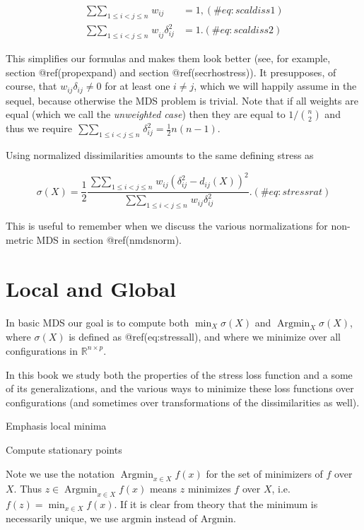 \documentclass[
  12pt,
  letterpaper,
  DIV=11,
  numbers=noendperiod]{scrreprt}
\theoremstyle{remark}
\begin{document}
\begin{align}
\mathop{\sum\sum}_{1\leq i<j\leq n}w_{ij}&=1,(\#eq:scaldiss1)\\
\mathop{\sum\sum}_{1\leq i<j\leq n}w_{ij}^{\ }\delta_{ij}^2&=1.(\#eq:scaldiss2)
\end{align}

This simplifies our formulas and makes them look better (see, for
example, section @ref(propexpand) and section @ref(secrhostress)). It
presupposes, of course, that \(w_{ij}\delta_{ij}\not=0\) for at least
one \(i\not= j\), which we will happily assume in the sequel, because
otherwise the MDS problem is trivial. Note that if all weights are equal
(which we call the \emph{unweighted case}) then they are equal to
\(1/\binom{n}{2}\) and thus we require
\(\mathop{\sum\sum}_{1\leq i<j\leq n}\delta_{ij}^2=\frac12n(n-1)\).

Using normalized dissimilarities amounts to the same defining stress as

\begin{equation}
\sigma(X)=\frac12\frac{\mathop{\sum\sum}_{1\leq i<j\leq n}w_{ij}(\delta_{ij}^2-d_{ij}(X))^2}{\mathop{\sum\sum}_{1\leq i<j\leq n}w_{ij}\delta_{ij}^2}.
(\#eq:stressrat)
\end{equation}

This is useful to remember when we discuss the various normalizations
for non-metric MDS in section @ref(nmdsnorm).

\section{Local and Global}\label{seclocglob}

In basic MDS our goal is to compute both \(\min_X\sigma(X)\) and
\(\mathop{\text{Argmin}}_X\sigma(X)\), where \(\sigma(X)\) is defined as
@ref(eq:stressall), and where we minimize over all configurations in
\(\mathbb{R}^{n\times p}\).

In this book we study both the properties of the stress loss function
and a some of its generalizations, and the various ways to minimize
these loss functions over configurations (and sometimes over
transformations of the dissimilarities as well).

Emphasis local minima

Compute stationary points

Note we use the notation \(\mathop{\text{Argmin}}_{x\in X}f(x)\) for the
set of minimizers of \(f\) over \(X\). Thus
\(z\in\mathop{\text{Argmin}}_{x\in X}f(x)\) means \(z\) minimizes \(f\)
over \(X\), i.e.~\(f(z)=\min_{x\in X} f(x)\). If it is clear from theory
that the minimum is necessarily unique, we use \(\text{argmin}\) instead
of \(\text{Argmin}\).
\end{document}
